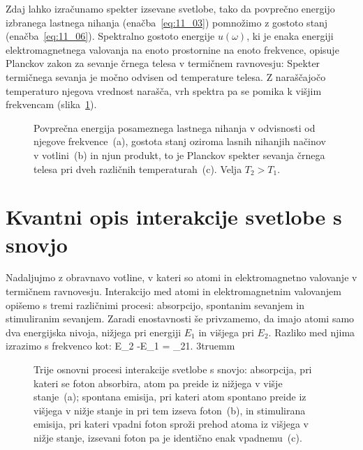Zdaj lahko izračunamo spekter izsevane svetlobe, tako da povprečno 
energijo izbranega lastnega nihanja (enačba~\ref{eq:11_03}) 
pomnožimo z gostoto stanj (enačba~\ref{eq:11_06}). 
Spektralno gostoto energije $u(\omega)$, ki je enaka energiji 
elektromagnetnega valovanja na enoto prostornine na enoto frekvence, 
opisuje Planckov zakon za sevanje črnega telesa v termičnem ravnovesju:
Spekter termičnega sevanja je močno odvisen od temperature telesa. Z naraščajočo
temperaturo njegova vrednost narašča, vrh spektra pa se pomika k višjim
frekvencam (slika~\ref{fig:11_Planck}).
\begin{figure}[h!]
\centering
\def\svgwidth{140truemm} 

\caption{Povprečna energija posameznega lastnega nihanja v odvisnosti
od njegove frekvence~(a), gostota stanj  oziroma lasnih nihanjih načinov
v votlini~(b) in njun produkt, to je Planckov spekter sevanja
črnega telesa pri dveh različnih temperaturah~(c). Velja $T_2>T_1$.
}
\label{fig:11_Planck}
\end{figure}

\section{Kvantni opis interakcije svetlobe s snovjo}
Nadaljujmo z obravnavo votline, v kateri so atomi 
in elektromagnetno valovanje v termičnem ravnovesju. 
Interakcijo med atomi in elektromagnetnim valovanjem 
opišemo s tremi različnimi procesi: absorpcijo, spontanim
sevanjem in stimuliranim sevanjem. Zaradi enostavnosti še
privzamemo, da imajo atomi samo dva energijska nivoja, nižjega pri energiji
$E_1$ in višjega pri $E_2$. Razliko med njima izrazimo s frekvenco kot:
\beq
E_2 -E_1 = \hslash \omega_{21}.
\label{eq:11_07}
\eeq
\vglue3truemm
\begin{figure}[h!]
\centering
\def\svgwidth{140truemm} 

\caption{Trije osnovni procesi interakcije svetlobe s snovjo:
absorpcija, pri kateri se foton absorbira, atom pa preide iz nižjega 
v višje stanje~(a); spontana emisija, pri kateri atom spontano preide 
iz višjega v nižje stanje in pri tem izseva foton~(b), in stimulirana 
emisija, pri kateri vpadni foton sproži prehod
atoma iz višjega v nižje stanje, izsevani foton pa je identično enak vpadnemu~(c).
}
\label{fig:11_procesi}
\end{figure}

